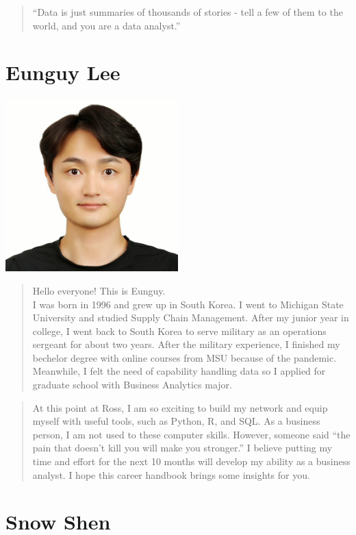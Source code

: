 \documentclass[
]{book}
\begin{document}
\begin{quote}
``Data is just summaries of thousands of stories - tell a few of them to the world, and you are a data analyst.''
\end{quote}

\hypertarget{eunguy-lee}{%
\section{Eunguy Lee}\label{eunguy-lee}}

\includegraphics[width=0.5\textwidth,height=\textheight]{Images/Eunguy.jpg}

\begin{quote}
Hello everyone! This is Eunguy.\\
I was born in 1996 and grew up in South Korea. I went to Michigan State University and studied Supply Chain Management. After my junior year in college, I went back to South Korea to serve military as an operations sergeant for about two years. After the military experience, I finished my bechelor degree with online courses from MSU because of the pandemic. Meanwhile, I felt the need of capability handling data so I applied for graduate school with Business Analytics major.
\end{quote}

\begin{quote}
At this point at Ross, I am so exciting to build my network and equip myself with useful tools, such as Python, R, and SQL. As a business person, I am not used to these computer skills. However, someone said ``the pain that doesn't kill you will make you stronger.'' I believe putting my time and effort for the next 10 months will develop my ability as a business analyst. I hope this career handbook brings some insights for you.
\end{quote}

\hypertarget{snow-shen}{%
\section{Snow Shen}\label{snow-shen}}
\end{document}
